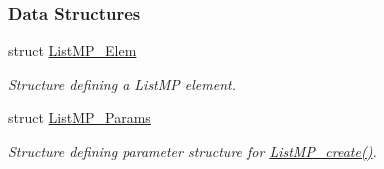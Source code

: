 \subsubsection*{Data Structures}
\begin{DoxyCompactItemize}
\item 
struct \hyperlink{struct_list_m_p___elem}{ListMP\_\-Elem}
\begin{DoxyCompactList}\small\item\em Structure defining a ListMP element. \item\end{DoxyCompactList}\item 
struct \hyperlink{struct_list_m_p___params}{ListMP\_\-Params}
\begin{DoxyCompactList}\small\item\em Structure defining parameter structure for \hyperlink{_list_m_p_8h_a71fdd7f30d377065fb70dd095a186d3e}{ListMP\_\-create()}. \item\end{DoxyCompactList}\end{DoxyCompactItemize}
